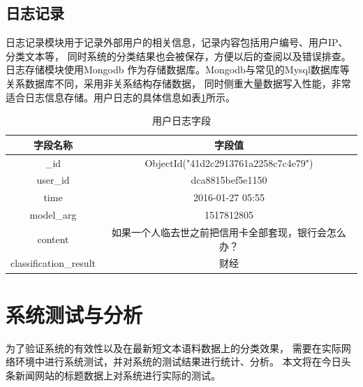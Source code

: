\subsection{日志记录}
日志记录模块用于记录外部用户的相关信息，记录内容包括用户编号、用户IP、分类文本等，
同时系统的分类结果也会被保存，方便以后的查阅以及错误排查。日志存储模块使用Mongodb
作为存储数据库。Mongodb与常见的Mysql数据库等关系数据库不同，采用非关系结构存储数据，
同时侧重大量数据写入性能，非常适合日志信息存储。用户日志的具体信息如表\ref{log_table}所示。
\begin{table}[h]
    \caption{用户日志字段}
    \begin{tabular}{|c|c|}
        \hline
        字段名称 & 字段值 \\
        \hline
        \_id & ObjectId("41d2c2913761a2258c7c4e79") \\
        \hline
        user\_id & dca8815bef5e1150 \\
        \hline
        time & 2016-01-27 05:55 \\
        \hline
        model\_arg & 1517812805 \\
        \hline
        content & 如果一个人临去世之前把信用卡全部套现，银行会怎么办？ \\
        \hline
        classification\_result & 财经 \\
        \hline
    \end{tabular}
    \label{log_table}
    \end{table}

\section{系统测试与分析}
为了验证系统的有效性以及在最新短文本语料数据上的分类效果，
需要在实际网络环境中进行系统测试，并对系统的测试结果进行统计、分析。
本文将在今日头条新闻网站的标题数据上对系统进行实际的测试。
